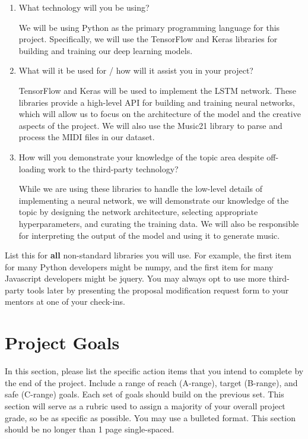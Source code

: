 \documentclass[]{article}
\begin{document}
\begin{enumerate}
	\item What technology will you be using?

    We will be using Python as the primary programming language for this project. Specifically, we will use the TensorFlow and Keras libraries for building and training our deep learning models.

	\item What will it be used for / how will it assist you in your project?

    TensorFlow and Keras will be used to implement the LSTM network. These libraries provide a high-level API for building and training neural networks, which will allow us to focus on the architecture of the model and the creative aspects of the project. We will also use the Music21 library to parse and process the MIDI files in our dataset.

	\item How will you demonstrate your knowledge of the topic area despite off-loading work to the third-party technology?

    While we are using these libraries to handle the low-level details of implementing a neural network, we will demonstrate our knowledge of the topic by designing the network architecture, selecting appropriate hyperparameters, and curating the training data. We will also be responsible for interpreting the output of the model and using it to generate music.
\end{enumerate}

List this for \textbf{all} non-standard libraries you will use. For example, the first item for many Python developers might be numpy, and the first item for many Javascript developers might be jquery. You may always opt to use more third-party tools later by presenting the proposal modification request form to your mentors at one of your check-ins.

\section{Project Goals}

In this section, please list the specific action items that you intend to complete by the end of the project. Include a range of reach (A-range), target (B-range), and safe (C-range) goals. Each set of goals should build on the previous set. This section will serve as a rubric used to assign a majority of your overall project grade, so be as specific as possible. You may use a bulleted format. This section should be no longer than 1 page single-spaced.
\end{document}
